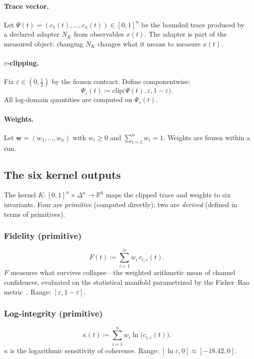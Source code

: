 \documentclass[
  aps,
  prd,
  twocolumn,
  superscriptaddress,
  nofootinbib,
  floatfix
]{revtex4-2}
\newcommand{\eps}{\varepsilon}
\newcommand{\beq}{\begin{equation}}
\newcommand{\eeq}{\end{equation}}
\newcommand{\wvec}{\mathbf{w}}
\begin{document}
\paragraph{Trace vector.}
Let $\Psi(t) = (c_1(t), \ldots, c_n(t)) \in [0,1]^n$ be the
bounded trace produced by a declared adapter $N_K$ from observables
$x(t)$.  The adapter is part of the measured object: changing
$N_K$ changes what it means to measure $x(t)$.

\paragraph{$\eps$-clipping.}
Fix $\eps \in (0, \tfrac{1}{2})$ by the frozen contract.  Define
componentwise:
\beq
  \Psi_\eps(t) \coloneqq
  \mathrm{clip}\bigl(\Psi(t), \eps, 1-\eps\bigr).
\eeq
All log-domain quantities are computed on $\Psi_\eps(t)$.

\paragraph{Weights.}
Let $\wvec = (w_1, \ldots, w_n)$ with $w_i \geq 0$ and
$\sum_{i=1}^n w_i = 1$.  Weights are frozen within a run.

\subsection{The six kernel outputs}

The kernel $K: [0,1]^n \times \Delta^n \to \mathbb{R}^6$ maps the
clipped trace and weights to six invariants.  Four are
\emph{primitive} (computed directly); two are \emph{derived}
(defined in terms of primitives).

\subsubsection{Fidelity (primitive)}
\beq
  F(t) \coloneqq \sum_{i=1}^n w_i \, c_{i,\eps}(t).
  \label{eq:F}
\eeq
$F$ measures what survives collapse---the weighted arithmetic mean
of channel confidences, evaluated on the statistical manifold
parametrized by the Fisher--Rao
metric~\cite{fisher1925,rao1945information,amari2016information}.
Range: $[\eps, 1-\eps]$.

\subsubsection{Log-integrity (primitive)}
\beq
  \kappa(t) \coloneqq \sum_{i=1}^n w_i \ln\!\bigl(c_{i,\eps}(t)\bigr).
  \label{eq:kappa}
\eeq
$\kappa$ is the logarithmic sensitivity of coherence.
Range: $[\ln\eps, 0] \approx [-18.42, 0]$.
\end{document}
